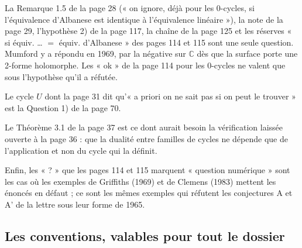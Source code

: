 \documentclass[11pt,a4paper]{article}
\begin{document}
La Remarque 1.5 de la page 28 (« on ignore, déjà pour les $0$-cycles, si
l'équivalence d'Albanese est identique à l'équivalence linéaire »), la note de
la page 29, l'hypothèse 2) de la page 117, la chaîne de la page 125 et les
réserves « si équiv. … $=$ équiv. d'Albanese » des pages 114 et 115
sont une seule question. Mumford y a répondu en 1969, par la négative sur
$\mathbb{C}$ dès que la surface porte une 2-forme holomorphe. Les « ok » de la
page 114 pour les $0$-cycles ne valent que sous l'hypothèse qu'il a réfutée.

Le cycle $U$ dont la page 31 dit qu'« a priori on ne sait pas si on peut le
trouver » est la Question 1) de la page 70.

Le Théorème 3.1 de la page 37 est ce dont aurait besoin la
vérification laissée ouverte à la page 36 : que la dualité entre familles de
cycles ne dépende que de l'application et non du cycle qui la définit.

Enfin, les « ? » que les pages 114 et 115 marquent « question numérique » sont
les cas où les exemples de Griffiths (1969) et de Clemens (1983)
mettent les énoncés en défaut ; ce sont les mêmes exemples qui réfutent les
conjectures A et A' de la lettre sous leur forme de 1965.

\subsection*{Les conventions, valables pour tout le dossier}
\end{document}
